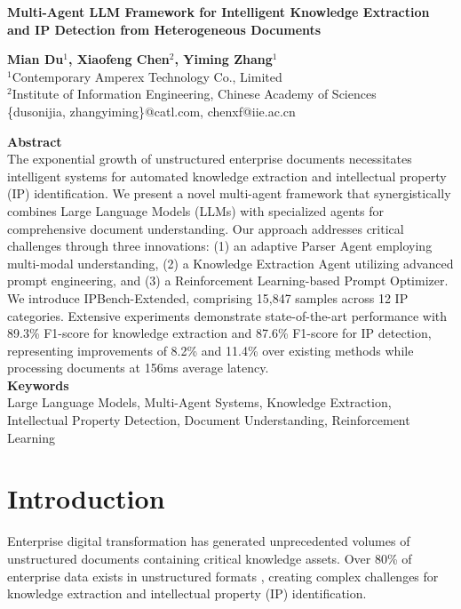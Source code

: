 \documentclass[11pt,a4paper]{article}
\newcommand{\mytitle}[1]{%
  \begin{center}
    {\fontsize{18}{22}\selectfont\bfseries #1}
  \end{center}
  \vspace{18pt}
}
\newcommand{\myauthors}[3]{%
  \begin{center}
    {\fontsize{12}{14}\selectfont\bfseries #1}\\[8pt]
    {\fontsize{11}{13}\selectfont #2}\\[6pt]
    {\fontsize{10}{12}\selectfont\ttfamily #3}\\[12pt]
  \end{center}
}
\newcommand{\myabstract}[1]{%
  {\fontsize{12}{14}\selectfont\bfseries Abstract}\\[6pt]
  {\fontsize{10}{12}\selectfont #1}\\[12pt]
}
\newcommand{\mykeywords}[1]{%
  {\fontsize{12}{14}\selectfont\bfseries Keywords}\\[6pt]
  {\fontsize{10}{12}\selectfont #1}\\[18pt]
}
\begin{document}
\mytitle{Multi-Agent LLM Framework for Intelligent Knowledge Extraction and IP Detection from Heterogeneous Documents}

\myauthors{Mian Du$^1$, Xiaofeng Chen$^2$, Yiming Zhang$^1$}{%
  $^1$Contemporary Amperex Technology Co., Limited\\
  $^2$Institute of Information Engineering, Chinese Academy of Sciences%
}{%
  \{dusonijia, zhangyiming\}@catl.com, chenxf@iie.ac.cn%
}

\myabstract{%
The exponential growth of unstructured enterprise documents necessitates intelligent systems for automated knowledge extraction and intellectual property (IP) identification. We present a novel multi-agent framework that synergistically combines Large Language Models (LLMs) with specialized agents for comprehensive document understanding. Our approach addresses critical challenges through three innovations: (1) an adaptive Parser Agent employing multi-modal understanding, (2) a Knowledge Extraction Agent utilizing advanced prompt engineering, and (3) a Reinforcement Learning-based Prompt Optimizer. We introduce IPBench-Extended, comprising 15,847 samples across 12 IP categories. Extensive experiments demonstrate state-of-the-art performance with 89.3\% F1-score for knowledge extraction and 87.6\% F1-score for IP detection, representing improvements of 8.2\% and 11.4\% over existing methods while processing documents at 156ms average latency.%
}

\mykeywords{Large Language Models, Multi-Agent Systems, Knowledge Extraction, Intellectual Property Detection, Document Understanding, Reinforcement Learning}


\section{Introduction}

Enterprise digital transformation has generated unprecedented volumes of unstructured documents containing critical knowledge assets. Over 80\% of enterprise data exists in unstructured formats \citep{gandomi2015beyond}, creating complex challenges for knowledge extraction and intellectual property (IP) identification.
\end{document}
